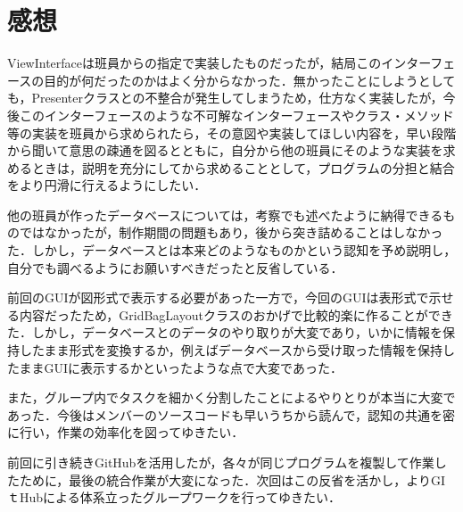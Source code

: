 \documentclass[12pt]{jarticle}
\begin{document}
\section{感想}
ViewInterfaceは班員からの指定で実装したものだったが，結局このインターフェースの目的が何だったのかはよく分からなかった．無かったことにしようとしても，Presenterクラスとの不整合が発生してしまうため，仕方なく実装したが，今後このインターフェースのような不可解なインターフェースやクラス・メソッド等の実装を班員から求められたら，その意図や実装してほしい内容を，早い段階から聞いて意思の疎通を図るとともに，自分から他の班員にそのような実装を求めるときは，説明を充分にしてから求めることとして，プログラムの分担と結合をより円滑に行えるようにしたい．

他の班員が作ったデータベースについては，考察でも述べたように納得できるものではなかったが，制作期間の問題もあり，後から突き詰めることはしなかった．しかし，データベースとは本来どのようなものかという認知を予め説明し，自分でも調べるようにお願いすべきだったと反省している．

前回のGUIが図形式で表示する必要があった一方で，今回のGUIは表形式で示せる内容だったため，GridBagLayoutクラスのおかげで比較的楽に作ることができた．しかし，データベースとのデータのやり取りが大変であり，いかに情報を保持したまま形式を変換するか，例えばデータベースから受け取った情報を保持したままGUIに表示するかといったような点で大変であった．

また，グループ内でタスクを細かく分割したことによるやりとりが本当に大変であった．今後はメンバーのソースコードも早いうちから読んで，認知の共通を密に行い，作業の効率化を図ってゆきたい．

前回に引き続きGitHubを活用したが，各々が同じプログラムを複製して作業したために，最後の統合作業が大変になった．次回はこの反省を活かし，よりGIｔHubによる体系立ったグループワークを行ってゆきたい．
\end{document}
